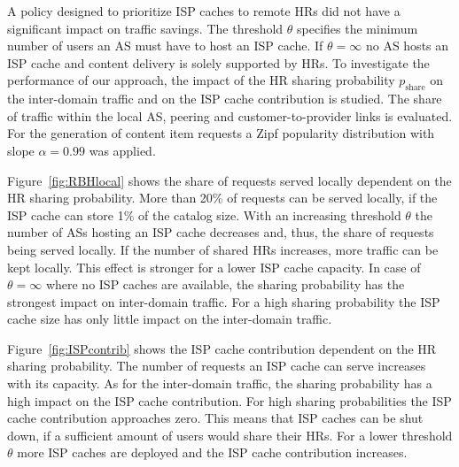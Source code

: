 A policy designed to prioritize ISP caches to remote HRs did not have a significant impact on traffic savings.
The threshold $\theta$ specifies the minimum number of users an AS must have to host an ISP cache. If $\theta=\infty$ no AS hosts an ISP cache and content delivery is solely supported by HRs.
To investigate the performance of our approach, the impact of the HR sharing probability $p_\text{share}$ on the inter-domain traffic and on the ISP cache contribution is studied. The share of traffic within the local AS, peering and customer-to-provider links is evaluated.
For the generation of content item requests a Zipf popularity distribution with slope $\alpha=0.99$ was applied.


Figure~\ref{fig:RBHlocal} shows the share of requests served locally dependent on the HR sharing probability. More than 20\% of requests can be served locally, if the ISP cache can store 1\% of the catalog size. With an increasing threshold $\theta$ the number of ASs hosting an ISP cache decreases and, thus, the share of requests being served locally. If the number of shared HRs increases, more traffic can be kept locally. This effect is stronger for a lower ISP cache capacity. In case of $\theta=\infty$ where no ISP caches are available, the sharing probability has the strongest impact on inter-domain traffic. For a high sharing probability the ISP cache size has only little impact on the inter-domain traffic.

Figure~\ref{fig:ISPcontrib} shows the ISP cache contribution dependent on the HR sharing probability. The number of requests an ISP cache can serve increases with its capacity. As for the inter-domain traffic, the sharing probability has a high impact on the ISP cache contribution. For high sharing probabilities the ISP cache contribution approaches zero. This means that ISP caches can be shut down, if a sufficient amount of users would share their HRs.
For a lower threshold $\theta$ more ISP caches are deployed and the ISP cache contribution increases.


